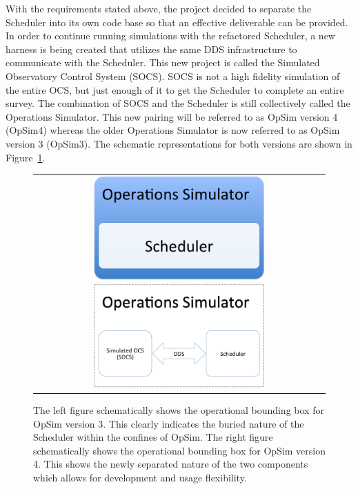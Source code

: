 \documentclass[]{spie}  %
\begin{document}
With the requirements stated above, the project decided to separate the Scheduler\cite{Delgado_SPIE2016} into its own code base so that an effective deliverable can be provided.  In order to continue running simulations with the refactored Scheduler, a new harness is being created that utilizes the same DDS infrastructure to communicate with the Scheduler. This new project is called the Simulated Observatory Control System (SOCS). SOCS is not a high fidelity simulation of the entire OCS, but just enough of it to get the Scheduler to complete an entire survey. The combination of SOCS and the Scheduler is still collectively called the Operations Simulator. This new pairing will be referred to as OpSim version 4 (OpSim4) whereas the older Operations Simulator is now referred to as OpSim version 3 (OpSim3). The schematic representations for both versions are shown in Figure~\ref{fig:opsim}.

\begin{figure} [ht]
  	\begin{center}
  		\begin{tabular}{c} 
  			\includegraphics[height=4cm]{Opsimv3.png}
  			\includegraphics[height=4cm]{Opsimv4.png}
  		\end{tabular}
  	\end{center}
  	\caption[What is this?] 
  	{ \label{fig:opsim} 
  		The left figure schematically shows the operational bounding box for OpSim version 3. This clearly indicates the buried nature of the Scheduler within the confines of OpSim. The right figure schematically shows the operational bounding box for OpSim version 4. This shows the newly separated nature of the two components which allows for development and usage flexibility.}
\end{figure} 
\end{document}
